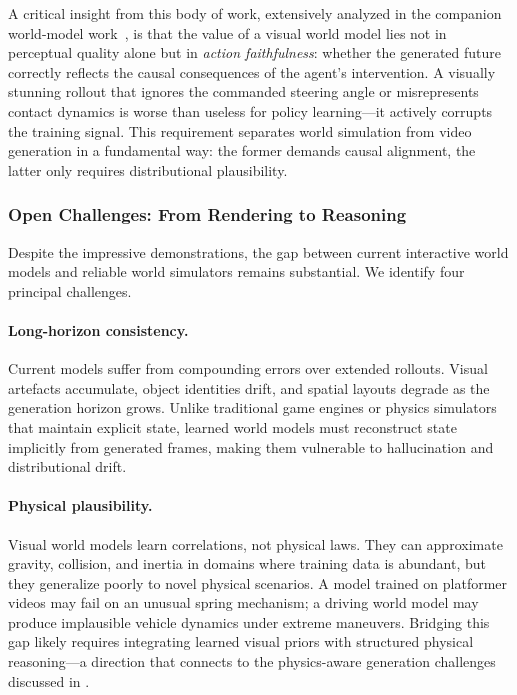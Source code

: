 A critical insight from this body of work, extensively analyzed in the companion world-model work~\citep{meietal2026videoroboticsurvey}, is that the value of a visual world model lies not in perceptual quality alone but in \emph{action faithfulness}: whether the generated future correctly reflects the causal consequences of the agent's intervention. A visually stunning rollout that ignores the commanded steering angle or misrepresents contact dynamics is worse than useless for policy learning---it actively corrupts the training signal. This requirement separates world simulation from video generation in a fundamental way: the former demands causal alignment, the latter only requires distributional plausibility.

\subsubsection{Open Challenges: From Rendering to Reasoning}

Despite the impressive demonstrations, the gap between current interactive world models and reliable world simulators remains substantial. We identify four principal challenges.

\paragraph{Long-horizon consistency.} Current models suffer from compounding errors over extended rollouts. Visual artefacts accumulate, object identities drift, and spatial layouts degrade as the generation horizon grows. Unlike traditional game engines or physics simulators that maintain explicit state, learned world models must reconstruct state implicitly from generated frames, making them vulnerable to hallucination and distributional drift.

\paragraph{Physical plausibility.} Visual world models learn correlations, not physical laws. They can approximate gravity, collision, and inertia in domains where training data is abundant, but they generalize poorly to novel physical scenarios. A model trained on platformer videos may fail on an unusual spring mechanism; a driving world model may produce implausible vehicle dynamics under extreme maneuvers. Bridging this gap likely requires integrating learned visual priors with structured physical reasoning---a direction that connects to the physics-aware generation challenges discussed in .

